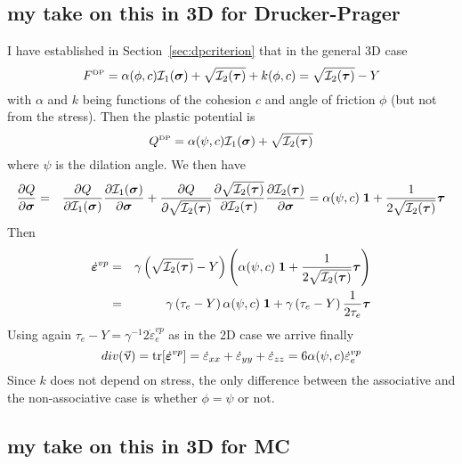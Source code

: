 \subsection{my take on this in 3D for Drucker-Prager}


I have established in Section~\ref{sec:dpcriterion} that in the general 3D case
\begin{equation}
F^{\text{\tiny DP}}= \alpha(\phi,c) {\cal I}_1({\bm \sigma}) + \sqrt{ {\cal I}_2({\bm \tau})  } + k(\phi,c) 
=\sqrt{  {\cal I}_2({\bm \tau})  } -Y 
\end{equation}
with $\alpha$ and $k$ being functions of the cohesion $c$ and angle of friction $\phi$ 
(but not from the stress). Then the plastic potential is
\begin{equation}
Q^{\text{\tiny DP}}= \alpha(\psi,c) {\cal I}_1({\bm \sigma})   +  \sqrt{  {\cal I}_2({\bm \tau})  } 
\end{equation}
where $\psi$ is the dilation angle.
We then have
\begin{eqnarray}
\frac{\partial Q}{\partial \bm\sigma} 
&=&
\frac{\partial Q}{\partial {\cal I}_1(\bm\sigma)} 
\frac{\partial {\cal I}_1(\bm\sigma)}{\partial \bm\sigma} 
+
\frac{\partial Q}{\partial \sqrt{{\cal I}_2(\bm\tau)}} 
\frac{\partial \sqrt{ {\cal I}_2(\bm\tau)}   }{\partial {\cal I}_2(\bm\tau)} 
\frac{\partial {\cal I}_2(\bm\tau)}{\partial \bm\sigma} 
=
\alpha(\psi,c) \; {\bm 1} + \frac{1}{2 \sqrt{ {\cal I}_2(\bm\tau)}} 
\bm\tau
\end{eqnarray}
Then 
\begin{eqnarray}
\dot{\bm \varepsilon}^{vp} 
&=& \gamma \left(\sqrt{{\cal I}_2(\bm\tau)} - Y \right)
\left(\alpha(\psi,c) \;  {\bm 1} + \frac{1}{2 \sqrt{{\cal I}_2(\bm \tau)}} {\bm \tau} \right) \nonumber\\
&=& \gamma \left(\tau_e - Y \right)
\alpha(\psi,c) \;  {\bm 1} 
+  
\gamma \left(\tau_e - Y \right)
\frac{1}{2 \tau_e} {\bm \tau}  
\end{eqnarray}
Using again $\tau_e - Y = \gamma^{-1} 2  \dot\varepsilon_e^{vp}$ as in the 2D case 
we arrive finally
\[
div (\vec\upnu)=
{\rm tr}[\dot{\bm \varepsilon}^{vp}]=
\dot{\varepsilon}_{xx}
+
\dot{\varepsilon}_{yy}
+
\dot{\varepsilon}_{zz}
=
6 \alpha(\psi,c) \dot\varepsilon_e^{vp}
\]
Since $k$ does not depend on stress, the only difference between the associative
and the non-associative case is whether $\phi=\psi$ or not.

\subsection{my take on this in 3D for MC}


